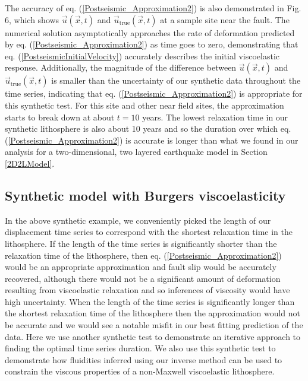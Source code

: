 The accuracy of eq. (\ref{Postseismic_Approximation2}) is also
demonstrated in Fig. 6, which shows $\vec{u}(\vec{x},t)$ and
$\vec{u}_{\mathrm{true}}(\vec{x},t)$ at a sample site near the fault.
The numerical solution asymptotically approaches the rate of
deformation predicted by eq. (\ref{Postseismic_Approximation2}) as
time goes to zero, demonstrating that
eq. (\ref{PostseismicInitialVelocity}) accurately describes the
initial viscoelastic response.  Additionally, the magnitude of the
difference between $\vec{u}(\vec{x},t)$ and
$\vec{u}_{\mathrm{true}}(\vec{x},t)$ is smaller than the uncertainty
of our synthetic data throughout the time series, indicating that
eq. (\ref{Postseismic_Approximation2}) is appropriate for this
synthetic test.  For this site and other near field sites, the
approximation starts to break down at about $t=10$ years. The lowest
relaxation time in our synthetic lithosphere is also about 10 years
and so the duration over which eq. (\ref{Postseismic_Approximation2})
is accurate is longer than what we found in our analysis for a
two-dimensional, two layered earthquake model in Section \ref{2D2LModel}.

\subsection{Synthetic model with Burgers viscoelasticity}\label{BurgersModel}
In the above synthetic example, we conveniently picked the length of
our displacement time series to correspond with the shortest
relaxation time in the lithosphere.  If the length of the time series
is significantly shorter than the relaxation time of the lithosphere,
then eq. (\ref{Postseismic_Approximation2}) would be an appropriate 
approximation and fault slip would be accurately recovered, although
there would not be a significant amount of deformation resulting from
viscoelastic relaxation and so inferences of viscosity would have high
uncertainty.  When the length of the time series is significantly
longer than the shortest relaxation time of the lithosphere then the
approximation would not be accurate and we would see a notable misfit
in our best fitting prediction of the data. Here we use another
synthetic test to demonstrate an iterative approach to finding the
optimal time series duration. We also use this synthetic test to
demonstrate how fluidities inferred using our inverse method can be
used to constrain the viscous properties of a non-Maxwell viscoelastic
lithosphere.

